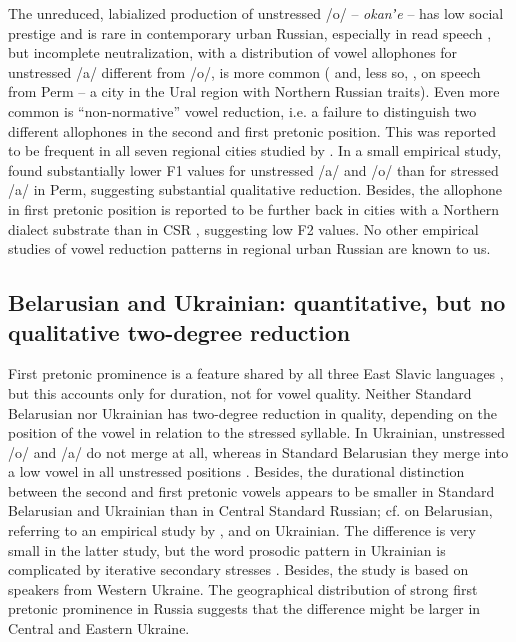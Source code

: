 \documentclass[output=paper,colorlinks,citecolor=black]{langscibook}
\begin{document}
The unreduced, labialized production of unstressed /o/ -- \textit{okanʼe} -- has low social prestige \citep{Andrews1995} and is rare in contemporary urban Russian, especially in read speech \citep{VerbickajaEtAl1984,Erofeeva1993}, but incomplete neutralization, with a distribution of vowel allophones for unstressed /a/ different from /o/, is more common (\citealt{Erofeeva1993} and, less so, \citealt{Erofeeva2005}, on speech from Perm -- a city in the Ural region with Northern Russian traits). Even more common is ``non-normative'' vowel reduction, i.e. a failure to distinguish two different allophones in the second and first pretonic position. This was reported to be frequent in all seven regional cities studied by \citet{VerbickajaEtAl1984}. In a small empirical study, \citet{Erofeeva2005} found substantially lower F1 values for unstressed /a/ and /o/ than for stressed /a/ in Perm, suggesting substantial qualitative reduction. Besides, the allophone in first pretonic position is reported to be further back in cities with a Northern dialect substrate than in CSR \citep{Kasatkina2005}, suggesting low F2 values. No other empirical studies of vowel reduction patterns in regional urban Russian are known to us.

\subsection{Belarusian and Ukrainian: quantitative, but no qualitative two-degree reduction}\label{post:subsec:belarusian}

First pretonic prominence is a feature shared by all three East Slavic languages \citep{Dubina2012}, but this accounts only for duration, not for vowel quality. Neither Standard Belarusian nor Ukrainian has two-degree reduction in quality, depending on the position of the vowel in relation to the stressed syllable. In Ukrainian, unstressed /o/ and /a/ do not merge at all, whereas in Standard Belarusian they merge into a low vowel in all unstressed positions \citep{Černjavskij2012,Dubina2012}. Besides, the durational distinction between the second and first pretonic vowels appears to be smaller in Standard Belarusian and Ukrainian than in Central Standard Russian; cf. \citet{Dubina2012} on Belarusian, referring to an empirical study by \citet{Andreeu1984}, and \citet{LukaszewiczEtAl2022} on Ukrainian. The difference is very small in the latter study, but the word prosodic pattern in Ukrainian is complicated by iterative secondary stresses \citep{LukaszewiczMolczanow2018}. Besides, the study is based on speakers from Western Ukraine. The geographical distribution of strong first pretonic prominence in Russia suggests that the difference might be larger in Central and Eastern Ukraine.
\end{document}
